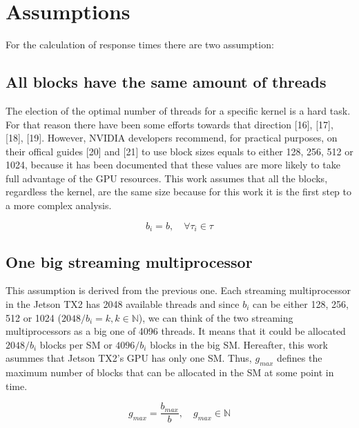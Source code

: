 \documentclass[
  12pt,
  a4paperpaper,
]{report}
\begin{document}
\hypertarget{assumptions}{%
\section{Assumptions}\label{assumptions}}

For the calculation of response times there are two assumption:

\hypertarget{all-blocks-have-the-same-amount-of-threads}{%
\subsection{All blocks have the same amount of
threads}\label{all-blocks-have-the-same-amount-of-threads}}

The election of the optimal number of threads for a specific kernel is a hard task.
For that reason there have been some efforts towards that
direction {[}16{]}, {[}17{]}, {[}18{]}, {[}19{]}. However, NVIDIA
developers recommend, for practical purposes, on their offical guides
{[}20{]} and {[}21{]} to use block sizes equals to either 128, 256, 512
or 1024, because it has been documented that these values are more
likely to take full advantage of the GPU resources. 
This work assumes that all the blocks, regardless the kernel, are the same size because for this work it is the first step to a more complex analysis.

\begin{equation} 
b_i = b, \quad \forall \tau_i \in \tau
\label{eq:blocksize}
\end{equation}

\hypertarget{one-big-streaming-multiprocessor}{%
\subsection{One big streaming
multiprocessor}\label{one-big-streaming-multiprocessor}}

This assumption is derived from the previous one. Each streaming
multiprocessor in the Jetson TX2 has 2048 available threads and since
\(b_i\) can be either 128, 256, 512 or 1024
(\(2048/ b_i = k, k \in \mathbb{N}\)), we can think of the two streaming
multiprocessors as a big one of 4096 threads.
It means that it could be allocated \(2048/b_i\) blocks per SM or
\(4096/b_i\) blocks in the big SM. 
Hereafter, this work asummes that Jetson TX2's GPU has only one SM.
Thus, \(g_{max}\) defines the maximum number of blocks that can be allocated in the SM at some point in time.

\begin{equation} 
g_{max} = \frac{b_{max}}{b}, \quad  g_{max} \in \mathbb{N}
\label{eq:max_grid}
\end{equation}
\end{document}

